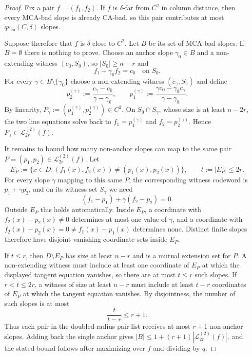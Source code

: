 \documentclass[11pt]{amsart}
\theoremstyle{definition}
\theoremstyle{remark}
\newcommand{\eca}{\varepsilon_{\mathrm{ca}}}
\begin{document}
\begin{proof}
Fix a pair $f=(f_1,f_2)$.  If $f$ is $\delta$-far from $C^2$ in column distance,
then every MCA-bad slope is already CA-bad, so this pair contributes at most
$q\eca(C,\delta)$ slopes.

Suppose therefore that $f$ is $\delta$-close to $C^2$.  Let $B$ be its set of
MCA-bad slopes.  If $B=\emptyset$ there is nothing to prove.  Choose an anchor
slope $\gamma_0\in B$ and a non-extending witness $(c_0,S_0)$, so
$|S_0|\ge n-r$ and
\[
        f_1+\gamma_0f_2=c_0\quad\text{on }S_0.
\]
For every $\gamma\in B\setminus\{\gamma_0\}$ choose a non-extending witness
$(c_\gamma,S_\gamma)$ and define
\[
        p_2^{(\gamma)}:=\frac{c_\gamma-c_0}{\gamma-\gamma_0},
        \qquad
        p_1^{(\gamma)}:=\frac{\gamma c_0-\gamma_0c_\gamma}{\gamma-\gamma_0}.
\]
By linearity, $P_\gamma:=(p_1^{(\gamma)},p_2^{(\gamma)})\in C^2$.  On
$S_0\cap S_\gamma$, whose size is at least $n-2r$, the two line equations solve
back to $f_1=p_1^{(\gamma)}$ and $f_2=p_2^{(\gamma)}$.  Hence
$P_\gamma\in\mathcal L_{2r}^{(2)}(f)$.

It remains to bound how many non-anchor slopes can map to the same pair
$P=(p_1,p_2)\in\mathcal L_{2r}^{(2)}(f)$.  Let
\[
        E_P:=\{x\in D:(f_1(x),f_2(x))\ne(p_1(x),p_2(x))\},
        \qquad t:=|E_P|\le2r.
\]
For every slope $\gamma$ mapping to this same $P$, the corresponding witness
codeword is $p_1+\gamma p_2$, and on its witness set $S_\gamma$ we need
\[
        (f_1-p_1)+\gamma(f_2-p_2)=0.
\]
Outside $E_P$ this holds automatically.  Inside $E_P$, a coordinate with
$f_2(x)-p_2(x)\ne0$ determines at most one value of $\gamma$, and a coordinate
with $f_2(x)-p_2(x)=0\ne f_1(x)-p_1(x)$ determines none.  Distinct finite slopes
therefore have disjoint vanishing coordinate sets inside $E_P$.

If $t\le r$, then $D\setminus E_P$ has size at least $n-r$ and is a mutual
extension set for $P$.  A non-extending witness must include at least one
coordinate of $E_P$ at which the displayed tangent equation vanishes, so there
are at most $t\le r$ such slopes.  If $r<t\le2r$, a witness of size at least
$n-r$ must include at least $t-r$ coordinates of $E_P$ at which the tangent
equation vanishes.  By disjointness, the number of such slopes is at most
\[
        \frac{t}{t-r}\le r+1.
\]
Thus each pair in the doubled-radius pair list receives at most $r+1$ non-anchor
slopes.  Adding back the single anchor gives
$|B|\le1+(r+1)|\mathcal L_{2r}^{(2)}(f)|$, and the stated bound follows after
maximizing over $f$ and dividing by $q$.
\end{proof}
\end{document}
